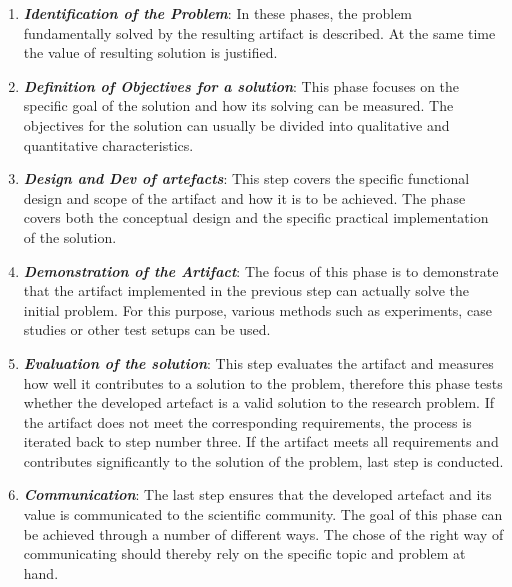 \begin{enumerate}
    \item \textbf{\textit{Identification of the Problem}}: In these phases, the problem fundamentally solved by the resulting artifact is described. At the same time the value of resulting solution is justified. %
    \item \textbf{\textit{Definition of Objectives for a solution}}: This phase focuses on the specific goal of the solution and how its solving can be measured. The objectives for the solution can usually be divided into qualitative and quantitative characteristics. 
    \item \textbf{\textit{Design and Dev of artefacts}}: This step covers the specific functional design and scope of the artifact and how it is to be achieved. The phase covers both the conceptual design and the specific practical implementation of the solution.
    \item \textbf{\textit{Demonstration of the Artifact}}: The focus of this phase is to demonstrate that the artifact implemented in the previous step can actually solve the initial problem. For this purpose, various methods such as experiments, case studies or other test setups can be used.
    \item \textbf{\textit{Evaluation of the solution}}: This step evaluates the artifact and measures how well it contributes to a solution to the problem, therefore this phase tests whether the developed artefact is a valid solution to the research problem. If the artifact does not meet the corresponding requirements, the process is iterated back to step number three. If the artifact meets all requirements and contributes significantly to the solution of the problem, last step is conducted. 
    \item \textbf{\textit{Communication}}: The last step ensures that the developed artefact and its value is communicated to the scientific community. The goal of this phase can be achieved through a number of different ways. The chose of the right way of communicating should thereby rely on the specific topic and problem at hand.
\end{enumerate}




